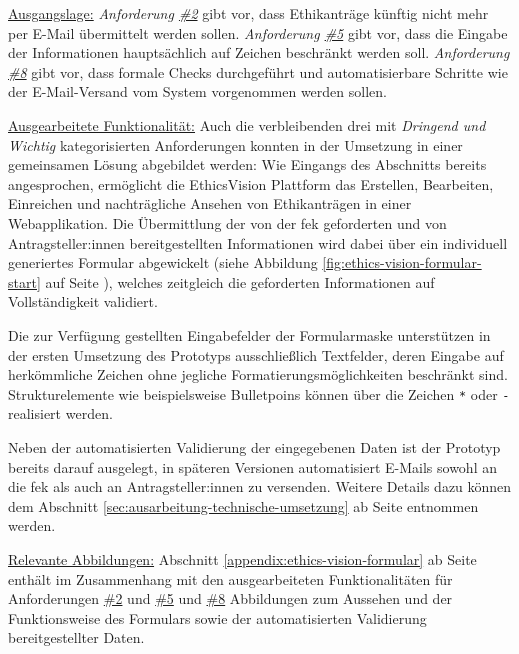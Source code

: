 \documentclass[a4paper,12pt,twoside]{scrreprt}
\begin{document}
\noindent\underline{Ausgangslage:} \textit{Anforderung \hyperref[sub-sub-sec:abgeleitete-anforderungen-während-erstellung-einreichung]{\#2}} gibt vor, dass Ethikanträge künftig nicht mehr per E-Mail übermittelt werden sollen. \textit{Anforderung \hyperref[sub-sub-sec:abgeleitete-anforderungen-während-erstellung-einreichung]{\#5}} gibt vor, dass die Eingabe der Informationen hauptsächlich auf Zeichen beschränkt werden soll. \textit{Anforderung \hyperref[sub-sub-sec:abgeleitete-anforderungen-nach-einreichung]{\#8}} gibt vor, dass formale Checks durchgeführt und automatisierbare Schritte wie der E-Mail-Versand vom System vorgenommen werden sollen.

\medskip

\noindent\underline{Ausgearbeitete Funktionalität:} Auch die verbleibenden drei mit \textit{Dringend und Wichtig} kategorisierten Anforderungen konnten in der Umsetzung in einer gemeinsamen Lösung abgebildet werden: Wie Eingangs des Abschnitts bereits angesprochen, ermöglicht die EthicsVision Plattform das Erstellen, Bearbeiten, Einreichen und nachträgliche Ansehen von Ethikanträgen in einer Webapplikation. Die Übermittlung der von der \ac{fek} geforderten und von Antragsteller:innen bereitgestellten Informationen wird dabei über ein individuell generiertes Formular abgewickelt (siehe Abbildung \ref{fig:ethics-vision-formular-start} auf Seite \pageref{fig:ethics-vision-formular-start}), welches zeitgleich die geforderten Informationen auf Vollständigkeit validiert.

Die zur Verfügung gestellten Eingabefelder der Formularmaske unterstützen in der ersten Umsetzung des Prototyps ausschließlich Textfelder, deren Eingabe auf herkömmliche Zeichen ohne jegliche Formatierungsmöglichkeiten beschränkt sind. Strukturelemente wie beispielsweise Bulletpoins können über die Zeichen \texttt{*} oder \texttt{-} realisiert werden.

Neben der automatisierten Validierung der eingegebenen Daten ist der Prototyp bereits darauf ausgelegt, in späteren Versionen automatisiert E-Mails sowohl an die \acl{fek} als auch an Antragsteller:innen zu versenden. Weitere Details dazu können dem Abschnitt \ref{sec:ausarbeitung-technische-umsetzung} ab Seite \pageref{sec:ausarbeitung-technische-umsetzung} entnommen werden.

\medskip

\noindent\underline{Relevante Abbildungen:} Abschnitt \ref{appendix:ethics-vision-formular} ab Seite \pageref{appendix:ethics-vision-formular} enthält im Zusammenhang mit den ausgearbeiteten Funktionalitäten für Anforderungen \hyperref[sub-sub-sec:abgeleitete-anforderungen-vorfeld-antrag]{\#2} und \hyperref[sub-sub-sec:abgeleitete-anforderungen-während-erstellung-einreichung]{\#5} und \hyperref[sub-sub-sec:abgeleitete-anforderungen-nach-einreichung]{\#8} Abbildungen zum Aussehen und der Funktionsweise des Formulars sowie der automatisierten Validierung bereitgestellter Daten.
\end{document}
